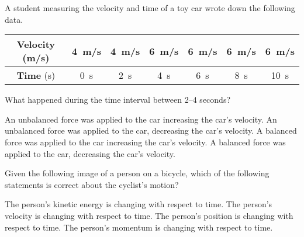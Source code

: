 \documentclass[answers]{exam}
\begin{document}
\begin{questions}
\question
A student measuring the velocity and time of a toy car wrote down the following data.

\begin{center}
    \begin{tabular}{|c|c|c|c|c|c|c|}
        \hline
        \textbf{Velocity} (m/s) & \SI{4}{m/s} &  \SI{4}{m/s} & \SI{6}{m/s} & \SI{6}{m/s} & \SI{6}{m/s} & \SI{6}{m/s} \\ \hline
        \textbf{Time} (s) & \SI{0}{s} & \SI{2}{s} & \SI{4}{s} & \SI{6}{s} & \SI{8}{s} & \SI{10}{s} \\
        \hline
    \end{tabular}
\end{center}

What happened during the time interval between 2--4 seconds?

\begin{randomizechoices}
    \correctchoice An unbalanced force was applied to the car increasing the car’s velocity.
    \choice An unbalanced force was applied to the car, decreasing the car’s velocity.
    \choice A balanced force was applied to the car increasing the car’s velocity.
    \choice A balanced force was applied to the car, decreasing the car’s velocity.   
\end{randomizechoices}


\question 
Given the following image of a person on a bicycle, which of the following statements is correct about the cyclist’s motion?


\begin{center}
\end{center}

\begin{randomizechoices}
    \choice The person’s kinetic energy is changing with respect to time.
    \choice The person’s velocity is changing with respect to time.
    \correctchoice The person’s position is changing with respect to time.
    \choice The person’s momentum is changing with respect to time.
\end{randomizechoices}


\end{questions}
\end{document}
